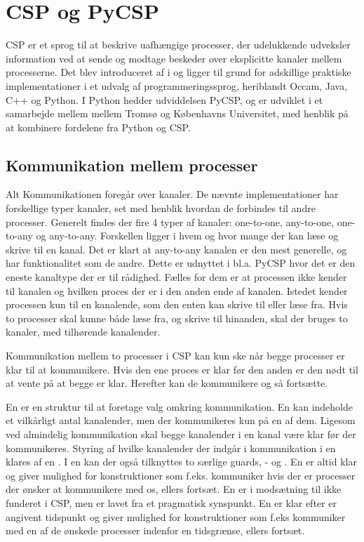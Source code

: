 \chapter{CSP og PyCSP}
CSP er et sprog til at beskrive uafhængige processer, der udelukkende udveksler information ved at sende og modtage beskeder over eksplicitte kanaler mellem processerne. Det blev introduceret af \citeauthor{hoare-csp} i \cite{hoare-csp} og ligger til grund for adskillige praktiske implementationer i et udvalg af programmeringssprog, heriblandt Occam, Java, C++ og Python\cite{May1983, jcsp, Brown2007, pycsp}. I Python hedder udviddelsen PyCSP, og er udviklet i et samarbejde mellem mellem Tromsø og Københavns Universitet, med henblik på at kombinere fordelene fra Python og CSP. 

\section{Kommunikation mellem processer}
Alt Kommunikationen foregår over kanaler. De nævnte implementationer har forskellige typer kanaler, set med henblik hvordan de forbindes til andre processer. Generelt findes der fire 4 typer af kanaler: one-to-one, any-to-one, one-to-any og any-to-any. Forskellen ligger i hvem og hvor mange der kan læse og skrive til en kanal. Det er klart at any-to-any kanalen er den mest generelle, og har funktionalitet som de andre. Dette er udnyttet i bl.a. PyCSP hvor det er den eneste kanaltype der er til rådighed. Fælles for dem er at processen ikke kender til kanalen og hvilken proces der er i den anden ende af kanalen. Istedet kender processen kun til en  kanalende, som  den enten kan skrive til eller læse fra. Hvis to processer skal kunne både læse fra, og skrive til hinanden, skal der bruges to kanaler, med tilhørende kanalender. 

Kommunikation mellem to processer i CSP kan kun ske når begge processer er klar til at kommunikere. Hvis den ene proces er klar før den anden er den nødt til at vente på at begge er klar. Herefter kan de kommunikere og så fortsætte.

En  er en struktur til at foretage valg omkring kommunikation. En  kan indeholde et vilkårligt antal kanalender, men der kommunikeres kun på en af dem. Ligesom ved almindelig kommunikation skal begge kanalender i en kanal være klar før der kommunikeres. Styring af hvilke kanalender der indgår i kommunikation i en   klares af en . I en  kan der også tilknyttes to særlige guards, - og . En  er altid klar og giver mulighed for konstruktioner som f.eks. kommuniker hvis der er processer der ønsker at kommunikere med os, ellers fortsæt. En  er i modsætning til  ikke funderet i CSP, men er lavet fra et pragmatisk synspunkt. En  er klar efter er angivent tidspunkt og giver mulighed for konstruktioner som f.eks kommuniker med en af de ønskede processer indenfor en tidsgrænse, ellers fortsæt. 


